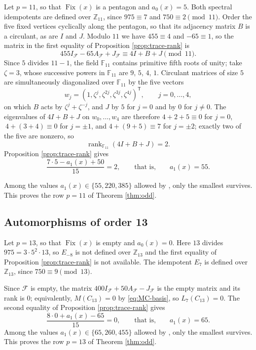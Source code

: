 \documentclass[11pt]{article}
\theoremstyle{plain}
\theoremstyle{remark}
\newcommand{\Fix}{\operatorname{Fix}}
\newcommand{\rank}{\operatorname{rank}}
\begin{document}
Let $p=11$, so that $\Fix(x)$ is a pentagon and $a_0(x)=5$.
Both spectral idempotents are defined over $\mathbb Z_{11}$, since $975\equiv 7$ and $750\equiv 2\pmod{11}$.
Order the five fixed vertices cyclically along the pentagon, so that its adjacency matrix $B$ is a circulant, as are $I$ and $J$.
Modulo $11$ we have $455\equiv 4$ and $-65\equiv 1$, so the matrix in the first equality of Proposition \ref{prop:trace-rank} is
\[
 455I_{\mathcal F}-65A_{\mathcal F}+J_{\mathcal F}\equiv 4I+B+J\pmod{11}.
\]
Since $5$ divides $11-1$, the field $\mathbb F_{11}$ contains primitive fifth roots of unity; take $\zeta=3$,
whose successive powers in $\mathbb F_{11}$ are $9$, $5$, $4$, $1$.
Circulant matrices of size $5$ are simultaneously diagonalized over $\mathbb F_{11}$ by the five vectors
\[
 w_j=(1,\zeta^j,\zeta^{2j},\zeta^{3j},\zeta^{4j})^{\mathsf T},\qquad j=0,\dots,4,
\]
on which $B$ acts by $\zeta^j+\zeta^{-j}$, and $J$ by $5$ for $j=0$ and by $0$ for $j\neq 0$.
The eigenvalues of $4I+B+J$ on $w_0,\dots,w_4$ are therefore
$4+2+5\equiv 0$ for $j=0$,
$\ 4+(3+4)\equiv 0$ for $j=\pm 1$,
and $4+(9+5)\equiv 7$ for $j=\pm 2$; exactly two of the five are nonzero, so
\[
 \rank_{\mathbb F_{11}}(4I+B+J)=2.
\]
Proposition \ref{prop:trace-rank} gives
\[
 \frac{7\cdot 5-a_1(x)+50}{15}=2,
 \qquad\text{that is,}\qquad
 a_1(x)=55.
\]

Among the values $a_1(x)\in\{55,220,385\}$ allowed by \cite[Lemma 12]{MacajSiran}, only the smallest survives.
This proves the row $p=11$ of Theorem \ref{thm:odd}.

\subsection{Automorphisms of order 13}\label{subsec:order13}

Let $p=13$, so that $\Fix(x)$ is empty and $a_0(x)=0$.
Here $13$ divides $975=3\cdot 5^2\cdot 13$,
so $E_{-8}$ is not defined over $\mathbb Z_{13}$ and the first equality of Proposition \ref{prop:trace-rank} is not available.
The idempotent $E_7$ is defined over $\mathbb Z_{13}$, since $750\equiv 9\pmod{13}$.

Since $\mathcal F$ is empty,
the matrix $400I_{\mathcal F}+50A_{\mathcal F}-J_{\mathcal F}$ is the empty matrix and its rank is $0$; equivalently,
$M(C_{13})=0$ by \eqref{eq:MC-basis}, so $L_7(C_{13})=0$.
The second equality of Proposition \ref{prop:trace-rank} gives
\[
 \frac{8\cdot 0+a_1(x)-65}{15}=0,
 \qquad\text{that is,}\qquad
 a_1(x)=65.
\]
Among the values $a_1(x)\in\{65,260,455\}$ allowed by \cite[Lemma 12]{MacajSiran}, only the smallest survives.
This proves the row $p=13$ of Theorem \ref{thm:odd}.
\end{document}
